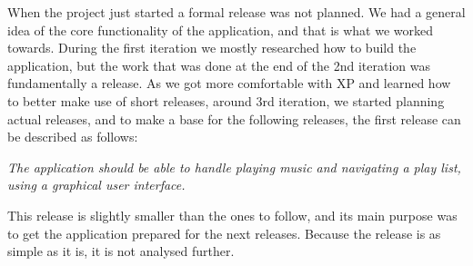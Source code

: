 When the project just started a formal release was not planned. We had a general idea of the core functionality of the application, and that is what we worked towards. During the first iteration we mostly researched how to build the application, but the work that was done at the end of the 2nd iteration was fundamentally a release. As we got more comfortable with XP and learned how to better make use of short releases, around 3rd iteration, we started planning actual releases, and to make a base for the following releases, the first release can be described as follows:

\textit{The application should be able to handle playing music and navigating a play list, using a graphical user interface.}

This release is slightly smaller than the ones to follow, and its main purpose was to get the application prepared for the next releases. Because the release is as simple as it is, it is not analysed further.